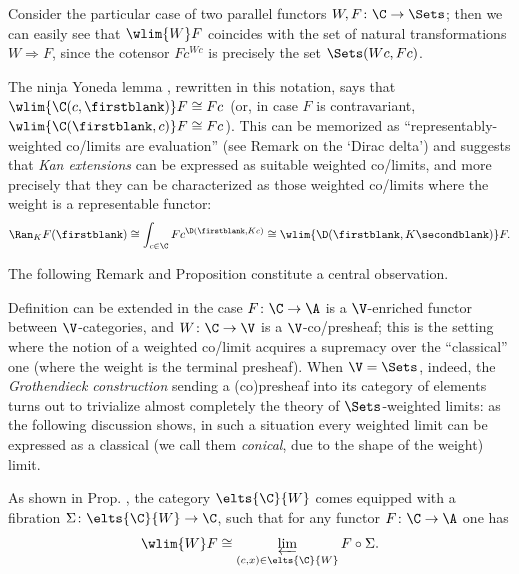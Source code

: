 \begin{example}
Consider the particular case of two parallel functors $W,F\colon \C\to\Sets$; then we can easily see that $\wlim{W}F$ coincides with the set of natural transformations $W\Rightarrow F$, since the cotensor $Fc^{Wc}$ is precisely the set $\Sets(Wc, Fc)$.
\end{example}
\begin{example}
The ninja Yoneda lemma , rewritten in this notation, says that $\wlim{\C(c,\firstblank)}F\cong Fc$ (or, in case $F$ is contravariant, $\wlim{\C(\firstblank,c)}F\cong Fc$). This can be memorized as ``representably\hyp{}weighted co/limits are evaluation'' (see Remark  on the `Dirac delta') and suggests that \emph{Kan extensions} can be expressed as suitable weighted co/limits, and more precisely that they can be characterized as those weighted co/limits where the weight is a representable functor:
\[
\Ran_KF(\firstblank) \cong \int_{c\in\C} Fc^{\D(\firstblank, Kc)}\cong \wlim{\D(\firstblank, K\secondblank)}F.
\]
\end{example}
The following Remark and Proposition constitute a central observation.
\begin{remark}
Definition  can be extended in the case $F\colon \C\to\A$ is a $\V$-enriched functor between $\V$-categories, and $W\colon \C\to\V$ is a $\V$-co/presheaf; this is the setting where the notion of a weighted co/limit acquires a supremacy over the ``classical'' one (where the weight is the terminal presheaf). When $\V=\Sets$, indeed, the \emph{Grothendieck construction} sending a (co)presheaf into its category of elements turns out to trivialize almost completely the theory of $\Sets$-weighted limits: as the following discussion shows, in such a situation every weighted limit can be expressed as a classical (we call them \emph{conical}, due to the shape of the weight) limit.
\end{remark}
\begin{proposition}\label{elementi}
As shown in Prop\@. , the category $\elts{\C}{W}$ comes equipped with a fibration $\Sigma\colon \elts{\C}{W}\to\C$, such that for any functor $F\colon \C\to \A$ one has 
\[\wlim{W}F\cong \varprojlim_{(c,x)\in \elts{\C}{W}} F\circ \Sigma.\]
\end{proposition}
